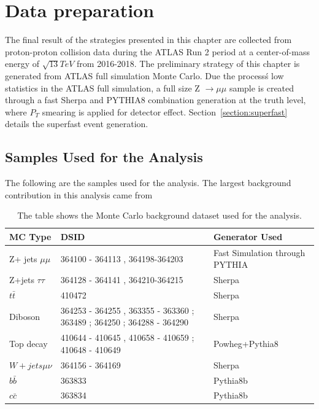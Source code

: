 \section{Data preparation}
The final result of the strategies presented in this chapter are collected from proton-proton collision data during the ATLAS Run 2 period at a center-of-mass energy of $\sqrt{13} TeV$ from 2016-2018. The preliminary strategy of this chapter is generated from ATLAS full simulation Monte Carlo. Due the process\'s low statistics in the ATLAS full simulation, a full size Z $\rightarrow \mu \mu$ sample is created through a fast Sherpa and PYTHIA8 combination generation at the truth level, where $P_{T}$ smearing is applied for detector effect. Section~\ref{section:superfast} details the superfast event generation.


\subsection{Samples Used for the Analysis}
The following are the samples used for the analysis. The largest background contribution in this analysis came from 

\begin{table}[!htb]
    \begin{center}
    \caption{
        The table shows the Monte Carlo background dataset used for the analysis. 
    \label{table:MC}
    }
\label{tab:MC samples}
\begin{tabular}{|l|l|l|}
\hline
\textbf{MC Type}   & \textbf{DSID}                                                         &\textbf{Generator Used}\\ \hline
Z+ jets $\mu\mu$   & 364100 - 364113 , 364198-364203                                       &Fast Simulation through PYTHIA\\ \hline
Z+jets $\tau \tau$ & 364128 - 364141 , 364210-364215                                       &Sherpa\\ \hline
$t\bar{t}$         & 410472                                                                &Sherpa\\ \hline
Diboson            & 364253 - 364255 , 363355 - 363360 ; 363489 ; 364250 ; 364288 - 364290 &Sherpa\\ \hline
Top decay          & 410644 - 410645 , 410658 - 410659 ; 410648 - 410649                   &Powheg+Pythia8\\ \hline
$W + jets \mu\nu$  & 364156 - 364169                                                       &Sherpa\\ \hline
$b\bar{b}$         & 363833                                                                &Pythia8b\\ \hline
$c\bar{c}$         & 363834                                                                &Pythia8b\\ \hline

\end{tabular}
\end{center}
\end{table}


